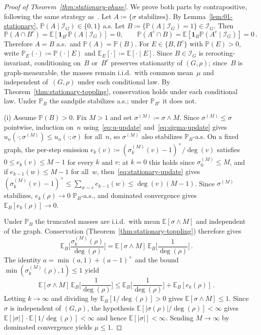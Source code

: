 \documentclass[11pt]{amsart}
\theoremstyle{plain}
\theoremstyle{definition}
\newcommand{\E}{\mathbb{E}}
\renewcommand{\P}{\mathbb{P}}
\newcommand{\one}{\mathbf{1}}
\begin{document}
	\begin{proof}[Proof of Theorem~\ref{thm:stationary-phase}]
		We prove both parts by contrapositive, following the same strategy as~\citet[Lemmas~4.1 and~4.2]{div-sand-crit}. Let $A\coloneqq\{\sigma\text{ stabilizes}\}$. By Lemma~\ref{lem:01-stationary}, $\P(A\mid\mathcal{I}_G)\in\{0,1\}$ a.s. Let $B\coloneqq\{\P(A\mid\mathcal{I}_G)=1\}\in\mathcal{I}_G$. Then
		\[
		\P(A\cap B^c)=\E[\one_{B^c}\P(A\mid\mathcal{I}_G)]=0,\qquad \P(A^c\cap B)=\E[\one_B\P(A^c\mid\mathcal{I}_G)]=0\,.
		\]
		Therefore $A=B$ a.s.\ and $\P(A)=\P(B)$. For $E\in\{B,B^c\}$ with $\P(E)>0$, write $\P_E(\cdot)\coloneqq\P(\cdot\mid E)$ and $\E_E[\cdot]\coloneqq\E[\cdot\mid E]$. Since $B\in\mathcal{I}_G$ is rerooting-invariant, conditioning on~$B$ or~$B^c$ preserves stationarity of $(G,\rho)$; since~$B$ is graph-measurable, the masses remain i.i.d.\ with common mean~$\mu$ and independent of~$(G,\rho)$ under each conditional law. By Theorem~\ref{thm:stationary-toppling}, conservation holds under each conditional law. Under $\P_B$ the sandpile stabilizes a.s.; under $\P_{B^c}$ it does not.
		
		\medskip
		\textup{(i)}\;
		Assume $\P(B)>0$. Fix $M>1$ and set $\sigma^{(M)}\coloneqq\sigma\wedge M$. Since $\sigma^{(M)}\leq\sigma$ pointwise, induction on~$n$ using~\eqref{eq:u-update} and~\eqref{eq:sigma-update} gives $u_n(\cdot;\sigma^{(M)})\leq u_n(\cdot;\sigma)$ for all~$n$, so $\sigma^{(M)}$ also stabilizes $\P_B$-a.s. On a fixed graph, the per-step emission $e_k(v)\coloneqq(\sigma_k^{(M)}(v)-1)^+/\deg(v)$ satisfies $0\leq e_k(v)\leq M-1$ for every $k$ and $v$: at $k=0$ this holds since $\sigma_0^{(M)}\leq M$, and if $e_{k-1}(w)\leq M-1$ for all~$w$, then~\eqref{eq:stationary-update} gives $(\sigma_k^{(M)}(v)-1)^+\leq\sum_{w\sim v}e_{k-1}(w)\leq\deg(v)(M-1)$. Since $\sigma^{(M)}$ stabilizes, $e_k(\rho)\to 0$ $\P_B$-a.s., and dominated convergence gives $\E_B[e_k(\rho)]\to 0$.
		
		Under $\P_B$ the truncated masses are i.i.d.\ with mean $\E[\sigma\wedge M]$ and independent of the graph. Conservation (Theorem~\ref{thm:stationary-toppling}) therefore gives
		\[
		\E_B\biggl[\frac{\sigma_k^{(M)}(\rho)}{\deg(\rho)}\biggr] = \E[\sigma\wedge M]\,\E_B\biggl[\frac{1}{\deg(\rho)}\biggr]\,.
		\]
		The identity $a=\min(a,1)+(a-1)^+$ and the bound $\min(\sigma_k^{(M)}(\rho),1)\leq 1$ yield
		\[
		\E[\sigma\wedge M]\,\E_B\biggl[\frac{1}{\deg(\rho)}\biggr] \leq \E_B\biggl[\frac{1}{\deg(\rho)}\biggr] + \E_B[e_k(\rho)]\,.
		\]
		Letting $k\to\infty$ and dividing by $\E_B[1/\deg(\rho)]>0$ gives $\E[\sigma\wedge M]\leq 1$. Since $\sigma$ is independent of $(G,\rho)$, the hypothesis $\E[|\sigma(\rho)|/\deg(\rho)]<\infty$ gives $\E[|\sigma|]\cdot\E[1/\deg(\rho)]<\infty$ and hence $\E[|\sigma|]<\infty$. Sending $M\to\infty$ by dominated convergence yields $\mu\leq 1$.
		

\end{proof}
\end{document}
